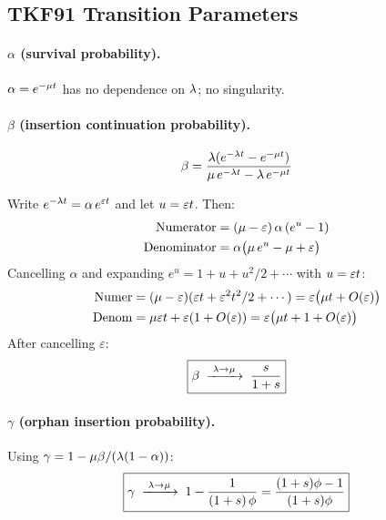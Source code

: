 \subsection{TKF91 Transition Parameters}

\paragraph{$\alpha$ (survival probability).}
$\alpha = e^{-\mu t}$ has no dependence on $\lambda$;
no singularity.

\paragraph{$\beta$ (insertion continuation probability).}
\begin{equation}
\beta = \frac{\lambda(e^{-\lambda t} - e^{-\mu t})}
             {\mu\,e^{-\lambda t} - \lambda\,e^{-\mu t}}
\end{equation}

Write $e^{-\lambda t} = \alpha\,e^{\varepsilon t}$ and
let $u = \varepsilon t$.
Then:
\begin{align*}
\text{Numerator}
  &= (\mu - \varepsilon)\,\alpha\,(e^u - 1) \\
\text{Denominator}
  &= \alpha\bigl(\mu\,e^u - \mu + \varepsilon\bigr)
\end{align*}
Cancelling $\alpha$ and expanding $e^u = 1 + u + u^2/2 + \cdots$
with $u = \varepsilon t$:
\begin{align*}
\text{Numer} &= (\mu - \varepsilon)(\varepsilon t
  + \varepsilon^2t^2/2 + \cdots)
  = \varepsilon\bigl(\mu t + O(\varepsilon)\bigr) \\
\text{Denom} &= \mu\varepsilon t
  + \varepsilon(1 + O(\varepsilon))
  = \varepsilon\bigl(\mu t + 1 + O(\varepsilon)\bigr)
\end{align*}
After cancelling $\varepsilon$:
\begin{equation}
\boxed{\beta \;\xrightarrow{\;\lambda\to\mu\;}\;
  \frac{s}{1+s}}
\label{eq:beta-limit}
\end{equation}

\paragraph{$\gamma$ (orphan insertion probability).}
Using $\gamma = 1 - \mu\beta/(\lambda(1-\alpha))$:
\begin{equation}
\boxed{\gamma \;\xrightarrow{\;\lambda\to\mu\;}\;
  1 - \frac{1}{(1+s)\,\phi}
  = \frac{(1+s)\phi - 1}{(1+s)\phi}}
\label{eq:gamma-limit}
\end{equation}

